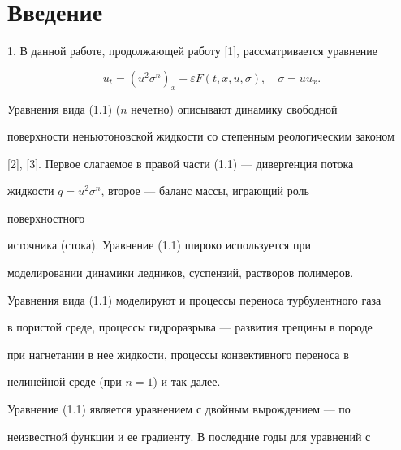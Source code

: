 




\maketitle





\section{Введение}





1. В данной работе, продолжающей работу [1], рассматривается уравнение


\begin{equation}


u_t=(u^2\sigma^n)_x+\varepsilon F(t,x,u,\sigma),


\quad \sigma=uu_x. \tag{1.1}


\end{equation}


Уравнения вида (1.1) ($n$ нечетно) описывают динамику свободной


поверхности неньютоновской жидкости со степенным реологическим законом


[2], [3]. Первое слагаемое в правой части (1.1) --- дивергенция потока


жидкости $q=u^2\sigma^n$, второе --- баланс массы, играющий роль


поверхностного


источника (стока). Уравнение (1.1) широко используется при


моделировании динамики ледников, суспензий, растворов полимеров.


Уравнения вида (1.1) моделируют и процессы переноса турбулентного газа


в пористой среде, процессы гидроразрыва --- развития трещины в породе


при нагнетании в нее жидкости, процессы конвективного переноса в


нелинейной среде (при $n=1$) и так далее.





Уравнение (1.1) является уравнением с двойным вырождением --- по


неизвестной функции и ее градиенту. В последние годы для уравнений с


